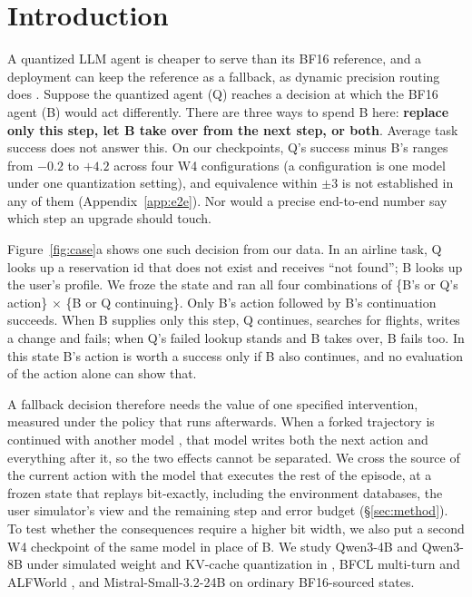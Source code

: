 \section{Introduction}
\label{sec:intro}

A quantized LLM agent is cheaper to serve than its BF16 reference, and a deployment can keep the reference as a fallback, as dynamic precision routing does \citep{li2026dynamicmp}. Suppose the quantized agent (Q) reaches a decision at which the BF16 agent (B) would act differently. There are three ways to spend B here: \textbf{replace only this step, let B take over from the next step, or both}. Average task success does not answer this. On our checkpoints, Q's success minus B's ranges from $-0.2$ to $+4.2$\pp{} across four W4 configurations (a configuration is one model under one quantization setting), and equivalence within $\pm$3\pp{} is not established in any of them (Appendix~\ref{app:e2e}). Nor would a precise end-to-end number say which step an upgrade should touch. %

Figure~\ref{fig:case}a shows one such decision from our data. In an airline task, Q looks up a reservation id that does not exist and receives ``not found''; B looks up the user's profile. We froze the state and ran all four combinations of \{B's or Q's action\} $\times$ \{B or Q continuing\}. Only B's action followed by B's continuation succeeds. When B supplies only this step, Q continues, searches for flights, writes a change and fails; when Q's failed lookup stands and B takes over, B fails too. %
In this state B's action is worth a success only if B also continues, and no evaluation of the action alone can show that.

A fallback decision therefore needs the value of one specified intervention, measured under the policy that runs afterwards. When a forked trajectory is continued with another model \citep{gonuguntla2026replay}, that model writes both the next action and everything after it, so the two effects cannot be separated. We cross the source of the current action with the model that executes the rest of the episode, at a frozen state that replays bit-exactly, including the environment databases, the user simulator's view and the remaining step and error budget (\S\ref{sec:method}). To test whether the consequences require a higher bit width, we also put a second W4 checkpoint of the same model in place of B. We study Qwen3-4B and Qwen3-8B \citep{yang2025qwen3} under simulated weight and KV-cache quantization in \tautwo{} \citep{yao2024tau,barres2025tau2}, BFCL multi-turn \citep{patil2025bfcl} and ALFWorld \citep{shridhar2021alfworld}, and Mistral-Small-3.2-24B \citep{mistral2025small32} on ordinary BF16-sourced \tautwo{} states. %

